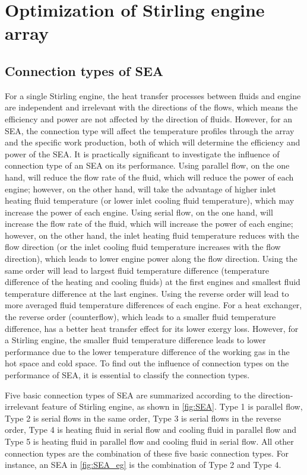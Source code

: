 \chapter{Optimization of Stirling engine array}

\section{Connection types of SEA}
\label{sec:connectionTypes}
For a single Stirling engine, the heat transfer processes between fluids and engine are independent and irrelevant with the directions of the flows, which means the efficiency and power are not affected by the direction of fluids. However, for an SEA, the connection type will affect the temperature profiles through the array and the specific work production, both of which will determine the efficiency and power of the SEA. It is practically significant to investigate the influence of connection type of an SEA on its performance. Using parallel flow, on the one hand, will reduce the flow rate of the fluid, which will reduce the power of each engine; however, on the other hand, will take the advantage of higher inlet heating fluid temperature (or lower inlet cooling fluid temperature), which may increase the power of each engine. Using serial flow, on the one hand, will increase the flow rate of the fluid, which will increase the power of each engine; however, on the other hand, the inlet heating fluid temperature reduces with the flow direction (or the inlet cooling fluid temperature increases with the flow direction), which leads to lower engine power along the flow direction. Using the same order will lead to largest fluid temperature difference (temperature difference of the heating and cooling fluids) at the first engines and smallest fluid temperature difference at the last engines. Using the reverse order will lead to more averaged fluid temperature differences of each engine. For a heat exchanger, the reverse order (counterflow), which leads to a smaller fluid temperature difference, has a better heat transfer effect for its lower exergy loss. However, for a Stirling engine, the smaller fluid temperature difference leads to lower performance due to the lower temperature difference of the working gas in the hot space and cold space. To find out the influence of connection types on the performance of SEA, it is essential to classify the connection types.

Five basic connection types of SEA are summarized according to the direction-irrelevant feature of Stirling engine, as shown in \autoref{fig:SEA}. Type 1 is parallel flow, Type 2 is serial flows in the same order, Type 3 is serial flows in the reverse order, Type 4 is heating fluid in serial flow and cooling fluid in parallel flow and Type 5 is heating fluid in parallel flow and cooling fluid in serial flow. All other connection types are the combination of these five basic connection types. For instance, an SEA in \autoref{fig:SEA_eg} is the combination of Type 2 and Type 4. 

